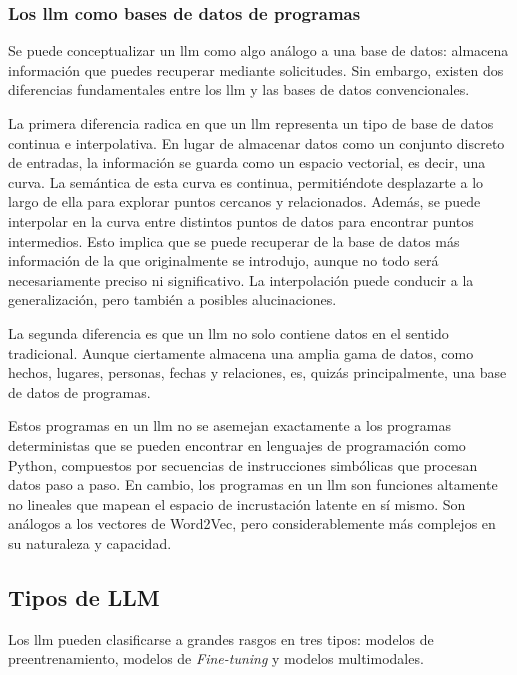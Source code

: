 \subsubsection{Los \acrshort{llm} como bases de datos de programas}

Se puede conceptualizar un \acrfull{llm} como algo análogo a una base de datos: almacena información que puedes recuperar mediante solicitudes. Sin embargo, existen dos diferencias fundamentales entre los \acrshort{llm} y las bases de datos convencionales.

La primera diferencia radica en que un \acrshort{llm} representa un tipo de base de datos continua e interpolativa. En lugar de almacenar datos como un conjunto discreto de entradas, la información se guarda como un espacio vectorial, es decir, una curva. La semántica de esta curva es continua, permitiéndote desplazarte a lo largo de ella para explorar puntos cercanos y relacionados. Además, se puede interpolar en la curva entre distintos puntos de datos para encontrar puntos intermedios. Esto implica que se puede recuperar de la base de datos más información de la que originalmente se introdujo, aunque no todo será necesariamente preciso ni significativo. La interpolación puede conducir a la generalización, pero también a posibles alucinaciones.

La segunda diferencia es que un \acrshort{llm} no solo contiene datos en el sentido tradicional. Aunque ciertamente almacena una amplia gama de datos, como hechos, lugares, personas, fechas y relaciones, es, quizás principalmente, una base de datos de programas.

Estos programas en un \acrshort{llm} no se asemejan exactamente a los programas deterministas que se pueden encontrar en lenguajes de programación como Python, compuestos por secuencias de instrucciones simbólicas que procesan datos paso a paso. En cambio, los programas en un \acrshort{llm} son funciones altamente no lineales que mapean el espacio de incrustación latente en sí mismo. Son análogos a los vectores de Word2Vec, pero considerablemente más complejos en su naturaleza y capacidad.

\subsection{Tipos de LLM}

Los \acrlong{llm} pueden clasificarse a grandes rasgos en tres tipos: modelos de preentrenamiento, modelos de \textit{Fine-tuning} y modelos multimodales\cite{scribbleData}.

